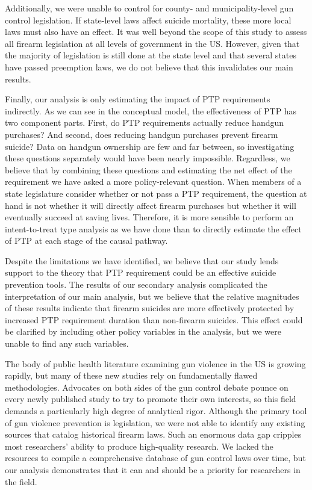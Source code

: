 \documentclass[]{article}
\begin{document}
Additionally, we were unable to control for county- and
municipality-level gun control legislation. If state-level laws affect
suicide mortality, these more local laws must also have an effect. It
was well beyond the scope of this study to assess all firearm
legislation at all levels of government in the US. However, given that
the majority of legislation is still done at the state level and that
several states have passed preemption laws, we do not believe that this
invalidates our main results.

Finally, our analysis is only estimating the impact of PTP requirements
indirectly. As we can see in the conceptual model, the effectiveness of
PTP has two component parts. First, do PTP requirements actually reduce
handgun purchases? And second, does reducing handgun purchases prevent
firearm suicide? Data on handgun ownership are few and far between, so
investigating these questions separately would have been nearly
impossible. Regardless, we believe that by combining these questions and
estimating the net effect of the requirement we have asked a more
policy-relevant question. When members of a state legislature consider
whether or not pass a PTP requirement, the question at hand is not
whether it will directly affect firearm purchases but whether it will
eventually succeed at saving lives. Therefore, it is more sensible to
perform an intent-to-treat type analysis as we have done than to
directly estimate the effect of PTP at each stage of the causal pathway.

Despite the limitations we have identified, we believe that our study
lends support to the theory that PTP requirement could be an effective
suicide prevention tools. The results of our secondary analysis
complicated the interpretation of our main analysis, but we believe that
the relative magnitudes of these results indicate that firearm suicides
are more effectively protected by increased PTP requirement duration
than non-firearm suicides. This effect could be clarified by including
other policy variables in the analysis, but we were unable to find any
such variables.

The body of public health literature examining gun violence in the US is
growing rapidly, but many of these new studies rely on fundamentally
flawed methodologies. Advocates on both sides of the gun control debate
pounce on every newly published study to try to promote their own
interests, so this field demands a particularly high degree of
analytical rigor. Although the primary tool of gun violence prevention
is legislation, we were not able to identify any existing sources that
catalog historical firearm laws. Such an enormous data gap cripples most
researchers' ability to produce high-quality research. We lacked the
resources to compile a comprehensive database of gun control laws over
time, but our analysis demonstrates that it can and should be a priority
for researchers in the field.
\end{document}
